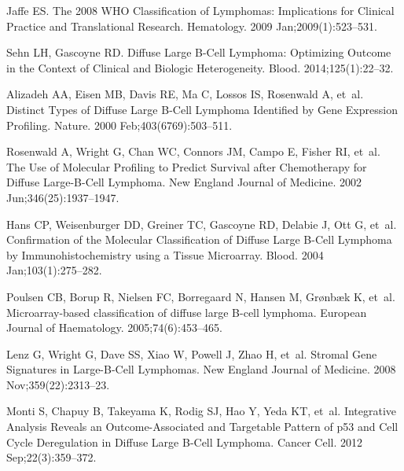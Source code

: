 \documentclass[10pt,letterpaper]{article}
\begin{document}
%
%
% 
\begin{thebibliography}{10}

Jaffe ES.
\newblock The 2008 {WHO} Classification of Lymphomas: Implications for Clinical
  Practice and Translational Research.
\newblock Hematology. 2009 Jan;2009(1):523--531.

Sehn LH, Gascoyne RD.
\newblock Diffuse Large {B}-Cell Lymphoma: Optimizing Outcome in the Context of
  Clinical and Biologic Heterogeneity.
\newblock Blood. 2014;125(1):22--32.

Alizadeh AA, Eisen MB, Davis RE, Ma C, Lossos IS, Rosenwald A, et~al.
\newblock Distinct Types of Diffuse Large {B}-Cell Lymphoma Identified by Gene
  Expression Profiling.
\newblock Nature. 2000 Feb;403(6769):503--511.

Rosenwald A, Wright G, Chan WC, Connors JM, Campo E, Fisher RI, et~al.
\newblock The Use of Molecular Profiling to Predict Survival after Chemotherapy
  for Diffuse Large-{B}-Cell Lymphoma.
\newblock New England Journal of Medicine. 2002 Jun;346(25):1937--1947.

Hans CP, Weisenburger DD, Greiner TC, Gascoyne RD, Delabie J, Ott G, et~al.
\newblock Confirmation of the Molecular Classification of Diffuse Large
  {B}-Cell Lymphoma by Immunohistochemistry using a Tissue Microarray.
\newblock Blood. 2004 Jan;103(1):275--282.

Poulsen CB, Borup R, Nielsen FC, Borregaard N, Hansen M, Gr{\o}nb{\ae}k K,
  et~al.
\newblock Microarray-based classification of diffuse large {B}-cell lymphoma.
\newblock European Journal of Haematology. 2005;74(6):453--465.

Lenz G, Wright G, Dave SS, Xiao W, Powell J, Zhao H, et~al.
\newblock Stromal Gene Signatures in Large-{B}-Cell Lymphomas.
\newblock New England Journal of Medicine. 2008 Nov;359(22):2313--23.

Monti S, Chapuy B, Takeyama K, Rodig SJ, Hao Y, Yeda KT, et~al.
\newblock Integrative Analysis Reveals an Outcome-Associated and Targetable
  Pattern of {p53} and Cell Cycle Deregulation in Diffuse Large {B}-Cell
  Lymphoma.
\newblock Cancer Cell. 2012 Sep;22(3):359--372.


\end{thebibliography}
\end{document}
